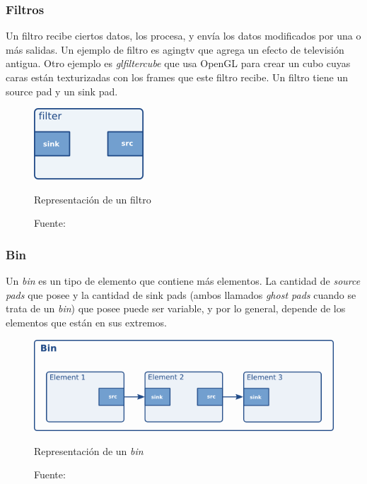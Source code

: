 \documentclass[a4paper,openright,12pt]{report}
\begin{document}
\subsubsection{Filtros}
Un filtro recibe ciertos datos, los procesa, y envía los datos modificados por
una o más salidas. Un ejemplo de filtro es agingtv que agrega un efecto de
televisión antigua. Otro ejemplo es \textit{glfiltercube} que usa OpenGL para
crear un cubo cuyas caras están texturizadas con los frames que este filtro
recibe. Un filtro tiene un source pad y un sink pad.

\begin{figure}[h]
  \centering
    \includegraphics{../images/pwg-filter-element.png}\par
  \caption{Representación de un filtro}
  \caption*{Fuente: \cite[p.~5]{boulton2017gstreamer}}
  \label{fig:gstreamer-filtro}
\end{figure}

\subsubsection{Bin}
Un \textit{bin} es un tipo de elemento que contiene más elementos. La cantidad
de \textit{source pads} que posee y la cantidad de sink pads (ambos llamados
\textit{ghost pads} cuando se trata de un \textit{bin}) que posee puede ser
variable, y por lo general, depende de los elementos que están en sus extremos.

\begin{figure}[h]
  \centering
    \includegraphics[width=\textwidth]{../images/ad-bin.png}\par
  \caption{Representación de un \textit{bin}}
  \caption*{Fuente: \cite{taymans2016gstreamer}}
\end{figure}
\end{document}
